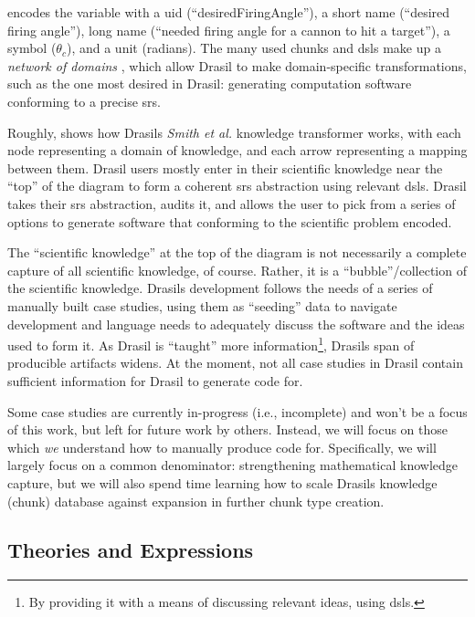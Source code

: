 \exampleAngleVariableEncoding{}

 encodes the variable with a \acs{uid}
(``desiredFiringAngle''), a short name (``desired firing angle''), long name
(``needed firing angle for a cannon to hit a target''), a symbol
(\(\theta{}_{c}\)), and a unit (radians). The many used chunks and \acsp{dsl}
make up a \textit{network of domains} \cite{Czarnecki2005}, which allow Drasil
to make domain-specific transformations, such as the one most desired in Drasil:
generating computation software conforming to a precise \acs{srs}.

\roughNetworkOfDomainsIntro{}

Roughly,  shows how Drasils \textit{Smith et
      al.} knowledge transformer works, with each node representing a domain of
knowledge, and each arrow representing a mapping between them. Drasil users
mostly enter in their scientific knowledge near the ``top'' of the diagram to
form a coherent \acs{srs} abstraction using relevant \acsp{dsl}. Drasil takes
their \acs{srs} abstraction, audits it, and allows the user to pick from a
series of options to generate software that conforming to the scientific problem
encoded.

The ``scientific knowledge'' at the top of the diagram is not necessarily a
complete capture of all scientific knowledge, of course. Rather, it is a
``bubble''/collection of the scientific knowledge. Drasils development follows
the needs of a series of manually built case studies, using them as ``seeding''
data to navigate development and language needs to adequately discuss the
software and the ideas used to form it. As Drasil is ``taught'' more
information\footnote{By providing it with a means of discussing relevant ideas,
      using \aclp{dsl}.}, Drasils span of producible artifacts widens. At the moment,
not all case studies in Drasil contain sufficient information for Drasil to
generate code for.

Some case studies are currently in-progress (i.e., incomplete) and won't be a
focus of this work, but left for future work by others. Instead, we will focus
on those which \textit{we} understand how to manually produce code for.
Specifically, we will largely focus on a common denominator: strengthening
mathematical knowledge capture, but we will also spend time learning how to
scale Drasils knowledge (chunk) database against expansion in further chunk type
creation.

\subsection{Theories and Expressions}

